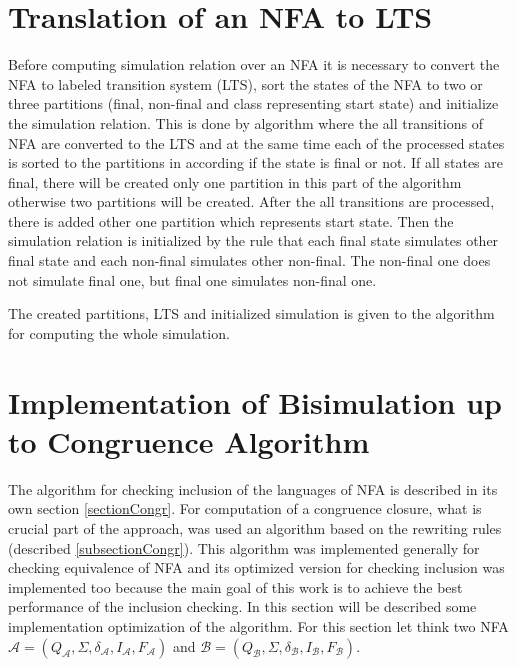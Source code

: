 \section{Translation of an NFA to LTS}
Before computing simulation relation over an NFA it is necessary to convert the NFA to labeled transition system (LTS), sort the states of the NFA to
two or three partitions (final, non-final and class representing start state) and initialize the simulation relation. This is done by algorithm where 
the all transitions of NFA are converted to the LTS and at the same time each of the processed states is sorted to the partitions in according if
the state is final or not. If all states are final, there will be created only one partition in this part of the algorithm otherwise two partitions will
be created. After the all transitions are processed, there is added other one partition which represents start state. Then the simulation relation is initialized
by the rule that each final state simulates other final state and each non-final simulates other non-final. The non-final one does not simulate final one, but 
final one simulates non-final one.

The created partitions, LTS and initialized simulation is given to the algorithm for computing the whole simulation. 

\section{Implementation of Bisimulation up to Congruence Algorithm}
\label{sectionCongrImpl}
The algorithm for checking inclusion of the languages of NFA is described in its own section \ref{sectionCongr}. For computation of a congruence closure, 
what is crucial part of the approach, was used an algorithm based on the rewriting rules (described \ref{subsectionCongr}). 
This algorithm was implemented generally for checking equivalence of NFA and its optimized version for checking inclusion was implemented too 
because the main goal of this work is to achieve the best performance of the inclusion checking. In this section will be described some implementation
optimization of the algorithm. For this section let think two NFA $\mathcal{A}=(Q_\mathcal{A},\Sigma,\delta_\mathcal{A},I_\mathcal{A},F_\mathcal{A})$ and
$\mathcal{B}=(Q_\mathcal{B},\Sigma,\delta_\mathcal{B},I_\mathcal{B},F_\mathcal{B})$.


